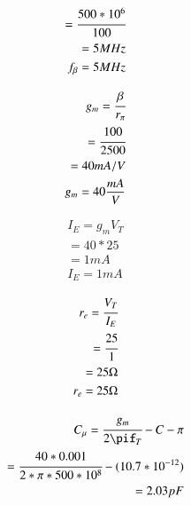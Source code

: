 \begin{enumerate}[label=\thesubsection.\arabic*.,ref=\thesubsection.\theenumi]
\begin{align}
               = \cfrac{500*{10^6}}{100} \\
        
               = 5 MHz \\
        
    f_{\beta} = 5 MHz
\end{align} 

\begin{align}
    
    g_{m} = \cfrac{\beta}{r_{\pi}} \\
    
          = \cfrac{100}{2500} \\
        
          = 40 mA/V \\
        
    g_{m}= 40 \frac{mA}{V}
        
\end{align}

\begin{align}

      I_{E} = g_{m}V_{T}\\
            
            = 40 * 25\\
            
            = 1 mA\\
            
      I_{E} = 1 mA
 
\end{align}
     
\begin{align}
    
      r_{e} = \cfrac{V_{T}}{I_{E}}\\
         
            = \cfrac{25}{1}\\
           
            = 25 \ohm\\
              
      r_{e} = 25 \ohm 
\end{align}

\begin{align}

      C_{\mu} = \cfrac{g_{m}}{2\pif_{T}}- C-{\pi}\\
            
              = \cfrac{40 * 0.001}{2*\pi*500*{10^8}}- (10.7*{10^{-12}})\\
              
              = 2.03 pF\\
        

\end{align}
\end{enumerate}
